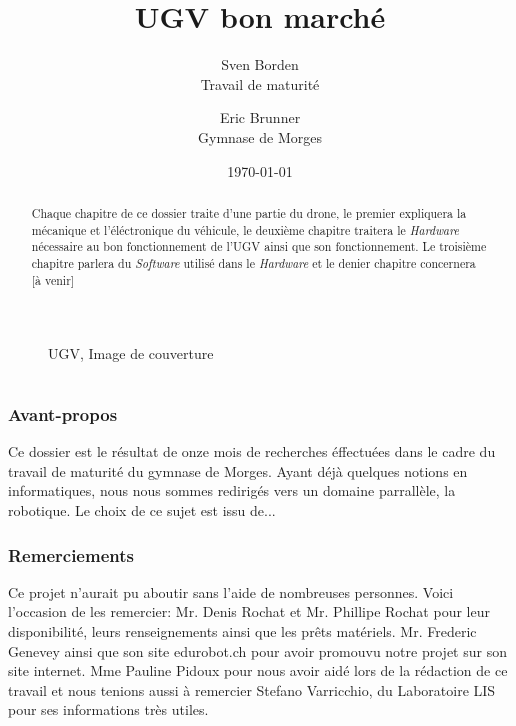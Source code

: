 \documentclass[a4paper,12pt]{article}
\begin{document}
{\selectfont %
\title{UGV bon marché}
\author{Sven Borden\\ \small Travail de maturité \and \normalsize Eric Brunner\\ \small Gymnase de Morges}

\date{\today}
\maketitle
\begin{center}
\begin{figure}[h!]
\caption{UGV, \small Image de couverture}
\end{figure}
\end{center}

\clearpage
\part{}

\section{Avant-propos}

Ce dossier est le résultat de onze mois de recherches éffectuées dans le cadre du travail de maturité du gymnase de Morges. Ayant déjà quelques notions en informatiques, nous nous sommes redirigés  vers un domaine parrallèle, la robotique. Le choix de ce sujet est issu de...

\clearpage

\section{Remerciements}
Ce projet n'aurait pu aboutir sans l'aide de nombreuses personnes. Voici l'occasion de les remercier: Mr. Denis Rochat et Mr. Phillipe Rochat pour leur disponibilité, leurs renseignements ainsi que les prêts matériels. Mr. Frederic Genevey ainsi que son site edurobot.ch pour avoir promouvu notre projet sur son site internet. Mme Pauline Pidoux pour nous avoir aidé lors de la rédaction de ce travail et nous tenions aussi à remercier Stefano Varricchio, du Laboratoire LIS pour ses informations très utiles.

\clearpage
\begin{abstract}
Chaque chapitre de ce dossier traite d'une partie du drone, le premier expliquera la mécanique et l'éléctronique du véhicule, le deuxième chapitre traitera le \textit{Hardware} nécessaire au bon fonctionnement de l'UGV ainsi que son fonctionnement. Le troisième chapitre parlera du \textit{Software} utilisé dans le \textit{Hardware} et le denier chapitre concernera [à venir]
\end{abstract}
\clearpage
\tableofcontents
\clearpage
\listoffigures
\clearpage
\listoftables 
\clearpage



}
\end{document}
